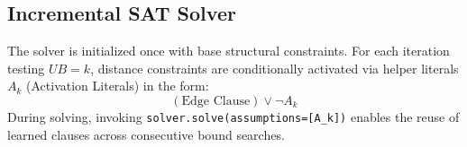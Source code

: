 \subsection{Incremental SAT Solver}
The solver is initialized once with base structural constraints. For each iteration testing $UB = k$, distance constraints are conditionally activated via helper literals $A_k$ (Activation Literals) in the form:
\begin{equation}
    (\text{Edge Clause}) \lor \neg A_k
\end{equation}
During solving, invoking \texttt{solver.solve(assumptions=[A\_k])} enables the reuse of learned clauses across consecutive bound searches.